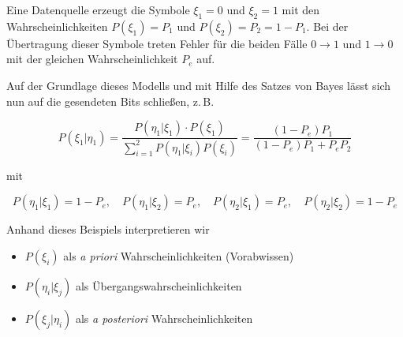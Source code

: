 \begin{beispiel}
Eine Datenquelle erzeugt die Symbole $\xi_1 = 0$ und $\xi_2 = 1$ mit den Wahrscheinlichkeiten $P(\xi_1) = P_1$ und $P(\xi_2) = P_2 = 1 - P_1$. Bei der Übertragung dieser Symbole treten Fehler für die beiden Fälle $0 \to 1$ und $1 \to 0$ mit der gleichen Wahrscheinlichkeit $P_e$ auf.

\begin{center}
\end{center}

Auf der Grundlage dieses Modells und mit Hilfe des Satzes von Bayes lässt sich nun auf die gesendeten Bits schließen, z.\,B.

$$
P(\xi_1|\eta_1) = \frac{P(\eta_1|\xi_1) \cdot P(\xi_1)}{\displaystyle\sum_{i=1}^{2} P(\eta_1|\xi_i)P(\xi_i)} = \frac{(1-P_e)P_1}{(1-P_e)P_1 + P_e P_2}
$$

mit

$$
P(\eta_1|\xi_1) = 1 - P_e, \quad P(\eta_1|\xi_2) = P_e, \quad P(\eta_2|\xi_1) = P_e, \quad P(\eta_2|\xi_2) = 1 - P_e
$$

Anhand dieses Beispiels interpretieren wir

\begin{itemize}
  \item $P(\xi_i)$ als \textit{a priori} Wahrscheinlichkeiten (Vorabwissen)
  \item $P(\eta_i|\xi_j)$ als Übergangswahrscheinlichkeiten
  \item $P(\xi_j|\eta_i)$ als \textit{a posteriori} Wahrscheinlichkeiten
\end{itemize}
\end{beispiel}

